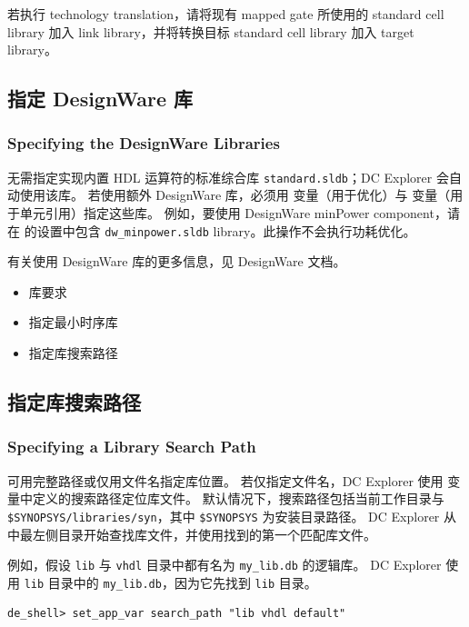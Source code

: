 若执行 technology translation，请将现有 mapped gate 所使用的 standard cell library 加入 link library，并将转换目标 standard cell library 加入 target library。

\subsection{指定 DesignWare 库}
\subsubsection*{Specifying the DesignWare Libraries}

无需指定实现内置 HDL 运算符的标准综合库 \texttt{standard.sldb}；DC Explorer 会自动使用该库。
若使用额外 DesignWare 库，必须用  变量（用于优化）与  变量（用于单元引用）指定这些库。
例如，要使用 DesignWare minPower component，请在  的设置中包含 \texttt{dw\_minpower.sldb} library。此操作不会执行功耗优化。

有关使用 DesignWare 库的更多信息，见 DesignWare 文档。

\begin{seeAlsoBox}
\begin{itemize}
  \item 库要求
  \item 指定最小时序库
  \item 指定库搜索路径
\end{itemize}
\end{seeAlsoBox}

\subsection{指定库搜索路径}
\subsubsection*{Specifying a Library Search Path}

可用完整路径或仅用文件名指定库位置。
若仅指定文件名，DC Explorer 使用  变量中定义的搜索路径定位库文件。
默认情况下，搜索路径包括当前工作目录与 \texttt{\$SYNOPSYS/libraries/syn}，其中 \texttt{\$SYNOPSYS} 为安装目录路径。
DC Explorer 从  中最左侧目录开始查找库文件，并使用找到的第一个匹配库文件。

例如，假设 \texttt{lib} 与 \texttt{vhdl} 目录中都有名为 \texttt{my\_lib.db} 的逻辑库。
DC Explorer 使用 \texttt{lib} 目录中的 \texttt{my\_lib.db}，因为它先找到 \texttt{lib} 目录。
\begin{lstlisting}
de_shell> set_app_var search_path "lib vhdl default"
\end{lstlisting}

